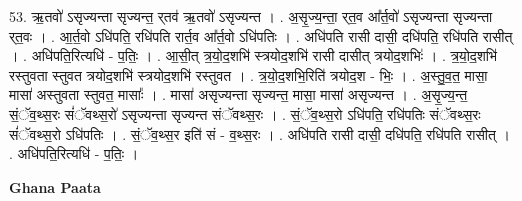 \documentclass[17pt]{extarticle}
\begin{document}
53. ऋ॒तवो॑ ऽसृज्यन्ता सृज्यन्त॒ र्‌तव॑ ऋ॒तवो॑ ऽसृज्यन्त । . अ॒सृ॒ज्य॒न्ता॒ र्‌त॒व आ᳚र्त॒वो॑ ऽसृज्यन्ता सृज्यन्ता र्‌त॒वः । . आ॒र्त॒वो ऽधि॑पति॒ रधि॑पति रार्त॒व आ᳚र्त॒वो ऽधि॑पतिः । . अधि॑पति रासी दासी॒ दधि॑पति॒ रधि॑पति रासीत् । . अधि॑पति॒रित्यधि॑ - प॒तिः॒ । . आ॒सी॒त् त्र॒यो॒द॒शभि॑ स्त्रयोद॒शभि॑ रासी दासीत् त्रयोद॒शभिः॑ । . त्र॒यो॒द॒शभि॑ रस्तुवता स्तुवत त्रयोद॒शभि॑ स्त्रयोद॒शभि॑ रस्तुवत । . त्र॒यो॒द॒शभि॒रिति॑ त्रयोद॒श - भिः॒ । . अ॒स्तु॒व॒त॒ मासा॒ मासा॑ अस्तुवता स्तुवत॒ मासाः᳚ । . मासा॑ असृज्यन्ता सृज्यन्त॒ मासा॒ मासा॑ असृज्यन्त । . अ॒सृ॒ज्य॒न्त॒ सं॒ॅव॒थ्स॒रः सं॑ॅवथ्स॒रो॑ ऽसृज्यन्ता सृज्यन्त संॅवथ्स॒रः । . सं॒ॅव॒थ्स॒रो ऽधि॑पति॒ रधि॑पतिः संॅवथ्स॒रः सं॑ॅवथ्स॒रो ऽधि॑पतिः । . सं॒ॅव॒थ्स॒र इति॑ सं - व॒थ्स॒रः । . अधि॑पति रासी दासी॒ दधि॑पति॒ रधि॑पति रासीत् । . अधि॑पति॒रित्यधि॑ - प॒तिः॒ । \newline

\textbf{Ghana Paata } \newline
\end{document}
